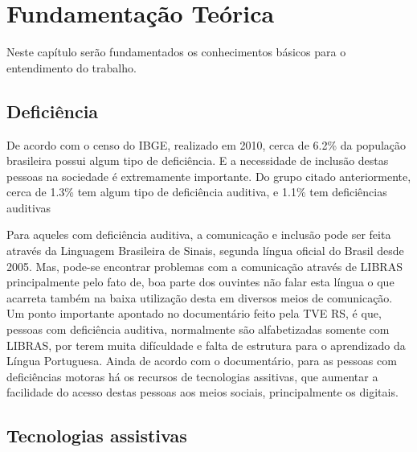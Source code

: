 \chapter{Fundamentação Teórica}
\label{ch:fundamentacao}
\par Neste capítulo ser\~ao fundamentados os conhecimentos b\'asicos para o entendimento do trabalho.

\section{Deficiência} %

\par De acordo com o censo do IBGE, realizado em 2010, cerca de 6.2\% da população brasileira possui algum tipo de deficiência. E a necessidade de inclusão destas pessoas na sociedade é extremamente importante. Do grupo citado anteriormente, cerca de 1.3\% tem algum tipo de deficiência auditiva, e 1.1\% tem deficiências auditivas

\par Para aqueles com deficiência auditiva, a comunicação e inclusão pode ser feita através da Linguagem Brasileira de Sinais, segunda língua oficial do Brasil desde 2005. Mas, pode-se encontrar problemas com a comunicação através de LIBRAS principalmente pelo fato de, boa parte dos ouvintes não falar esta língua o que acarreta também na baixa utilização desta em diversos meios de comunicação. Um ponto importante apontado no documentário feito pela TVE RS, é que, pessoas com deficiência auditiva, normalmente são alfabetizadas somente com LIBRAS, por terem muita difículdade e falta de estrutura para o aprendizado da Língua Portuguesa. Ainda de acordo com o documentário, para as pessoas com deficiências motoras há os recursos de tecnologias assitivas, que aumentar a facilidade do acesso destas pessoas aos meios sociais, principalmente os digitais.


\section{Tecnologias assistivas}

